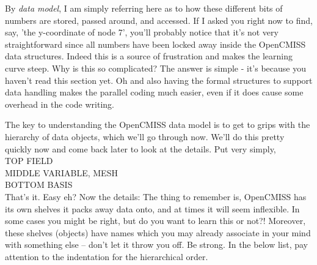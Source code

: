 By \textit{data model}, I am simply referring here as to how these different bits of numbers are stored,
passed around, and accessed. If I asked you right now to find, say, 'the y-coordinate of node 7', you'll
probably notice that it's not very straightforward since all numbers have been locked away inside the 
OpenCMISS data structures. Indeed this is a source of frustration and makes the learning curve steep.
Why is this so complicated? The answer is simple - it's because you haven't read this section yet. Oh 
and also having the formal structures to support data handling makes the parallel coding much easier,
even if it does cause some overhead in the code writing.

The key to understanding the OpenCMISS data model is to get to grips with the hierarchy of data objects, 
which we'll go through now. We'll do this pretty quickly now and come back later to look at the details.
Put very simply,\\
\textsf{
TOP \hspace{29mm} FIELD\\
MIDDLE \hspace{10mm} VARIABLE, MESH\\
BOTTOM \hspace{20mm} BASIS
}\\
That's it. Easy eh? Now the details:
The thing to remember is, OpenCMISS has its own shelves it packs away data onto, and at times it will 
seem inflexible. In some cases you might be right, but do you want to learn this or not?!  Moreover, 
these shelves (objects) have names which you may already associate in your mind with something else 
-- don't let it throw you off. Be strong.
In the below list, pay attention to the indentation for the hierarchical order.
